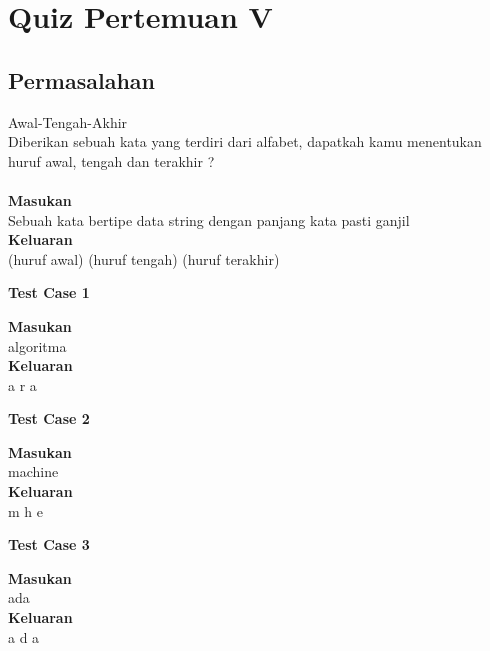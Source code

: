 \chapter{Quiz Pertemuan V}


\section{Permasalahan}
\begin{permasalahan}{Awal-Tengah-Akhir}\\
\label{prob:Alfa-Mid-Omega}
	Diberikan sebuah kata yang terdiri dari alfabet, dapatkah kamu menentukan huruf awal, tengah dan terakhir ? \\\\
	\textbf{Masukan}\\
	Sebuah kata bertipe data string dengan panjang kata pasti ganjil\\
	\textbf{Keluaran}\\
	(huruf awal) (huruf tengah) (huruf terakhir)\\
	\begin{center}
	\textbf{Test Case 1}\\
	\end{center}
	\textbf{Masukan}\\
	algoritma\\
	\textbf{Keluaran}\\
	a r a \\
	\begin{center}
	\textbf{Test Case 2}\\
	\end{center}
	\textbf{Masukan}\\
	machine\\
	\textbf{Keluaran}\\
	m h e\\
	\begin{center}
	\textbf{Test Case 3}\\
	\end{center}
	\textbf{Masukan}\\
	ada\\
	\textbf{Keluaran}\\
	a d a\\
\end{permasalahan}


